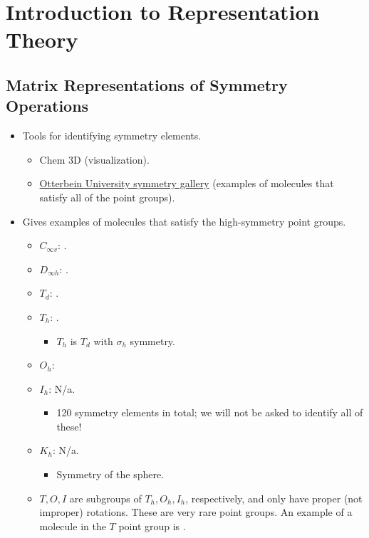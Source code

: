 \documentclass[../notes.tex]{subfiles}
\begin{document}
\chapter{Introduction to Representation Theory}
\section{Matrix Representations of Symmetry Operations}
\begin{itemize}
    \item {}Tools for identifying symmetry elements.
    \begin{itemize}
        \item Chem 3D (visualization).
        \item \href{https://symotter.org/gallery}{Otterbein University symmetry gallery} (examples of molecules that satisfy all of the point groups).
    \end{itemize}
    \item Gives examples of molecules that satisfy the high-symmetry point groups.
    \begin{itemize}
        \item $C_{\infty v}$: .
        \item $D_{\infty h}$: .
        \item $T_d$: .
        \item $T_h$: .
        \begin{itemize}
            \item $T_h$ is $T_d$ with $\sigma_h$ symmetry.
        \end{itemize}
        \item $O_h$: 
        \item $I_h$: N/a.
        \begin{itemize}
            \item 120 symmetry elements in total; we will not be asked to identify all of these!
        \end{itemize}
        \item $K_h$: N/a.
        \begin{itemize}
            \item Symmetry of the sphere.
        \end{itemize}
        \item $T,O,I$ are subgroups of $T_h,O_h,I_h$, respectively, and only have proper (not improper) rotations. These are very rare point groups. An example of a molecule in the $T$ point group is .

\end{itemize}
\end{itemize}
\end{document}
